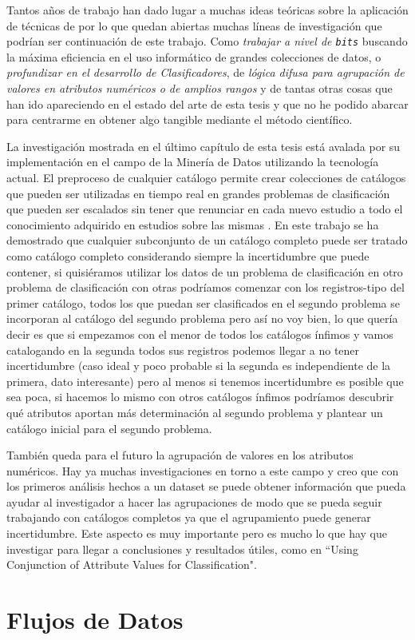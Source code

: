 
Tantos años de trabajo han dado lugar a muchas ideas teóricas sobre la aplicación de técnicas de \DM por lo que quedan abiertas muchas líneas de investigación que podrían ser continuación de este trabajo. Como \emph{trabajar a nivel de \texttt{bits}} buscando la máxima eficiencia en el uso informático de grandes colecciones de datos, o \emph{profundizar en el desarrollo de Clasificadores}, de \emph{lógica difusa para agrupación de valores en atributos numéricos o de amplios rangos} y de tantas otras cosas que han ido apareciendo en el estado del arte de esta tesis y que no he podido abarcar para centrarme en obtener algo tangible mediante el método científico.

La investigación mostrada en el último capítulo de esta tesis está avalada por su implementación en el campo de la Minería de Datos utilizando la tecnología actual.
El preproceso de cualquier catálogo permite crear colecciones de catálogos que pueden ser utilizadas en tiempo real en grandes problemas de clasificación que pueden ser escalados sin tener que renunciar en cada nuevo estudio a todo el conocimiento adquirido en estudios sobre las mismas \clases. En este trabajo se ha demostrado que cualquier subconjunto de un catálogo completo puede ser tratado como catálogo completo considerando siempre la incertidumbre que puede contener, si quisiéramos utilizar los datos de un problema de clasificación en otro problema de clasificación con otras \clases podríamos comenzar con los registros-tipo del primer catálogo, todos los que puedan ser clasificados en el segundo problema se incorporan al catálogo del segundo problema pero así no  voy bien, lo que quería decir es que si empezamos con el menor de todos los catálogos ínfimos y vamos catalogando en la segunda \clase todos sus registros podemos llegar a no tener incertidumbre (caso ideal y poco probable si la segunda \clase es independiente de la primera, dato interesante) pero al menos si tenemos incertidumbre es posible que sea poca, si hacemos lo mismo con otros catálogos ínfimos podríamos descubrir qué atributos aportan más determinación al segundo problema y plantear un catálogo inicial para el segundo problema.

También queda para el futuro la agrupación de valores en los atributos numéricos. Hay ya muchas investigaciones en torno a este campo y creo que con los primeros análisis hechos a un dataset se puede obtener información que pueda ayudar al investigador a hacer las agrupaciones de modo que se pueda seguir trabajando con catálogos completos ya que el agrupamiento puede generar incertidumbre. Este aspecto es muy importante pero es mucho lo que hay que investigar para llegar a conclusiones y resultados útiles, como en ``Using Conjunction of Attribute Values for Classification".






\section{Flujos de Datos}
\label{sec:clasificacion:flujos-de-datos}

